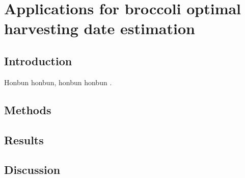\chapter{Applications for broccoli optimal harvesting date estimation}

\section{Introduction}

Honbun honbun, honbun honbun \citep{zhao_crop_2019}. 


\section{Methods}


\section{Results}

\section{Discussion}